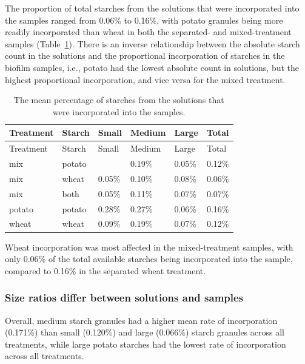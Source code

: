 \documentclass[
  b5paper,
]{book}
\begin{document}
The proportion of total starches from the solutions that were
incorporated into the samples ranged from 0.06\% to 0.16\%, with potato
granules being more readily incorporated than wheat in both the
separated- and mixed-treatment samples (Table~\ref{tbl-sample-prop}).
There is an inverse relationship between the absolute starch count in
the solutions and the proportional incorporation of starches in the
biofilm samples, i.e., potato had the lowest absolute count in
solutions, but the highest proportional incorporation, and vice versa
for the mixed treatment.

\hypertarget{tbl-sample-prop}{}
\begin{longtable}[]{@{}llllll@{}}
\caption{\label{tbl-sample-prop}The mean percentage of starches from the
solutions that were incorporated into the samples.}\tabularnewline
\toprule\noalign{}
Treatment & Starch & Small & Medium & Large & Total \\
\midrule\noalign{}
\endfirsthead
\toprule\noalign{}
Treatment & Starch & Small & Medium & Large & Total \\
\midrule\noalign{}
\endhead
\bottomrule\noalign{}
\endlastfoot
mix & potato & & 0.19\% & 0.05\% & 0.12\% \\
mix & wheat & 0.05\% & 0.10\% & 0.08\% & 0.06\% \\
mix & both & 0.05\% & 0.11\% & 0.07\% & 0.07\% \\
potato & potato & 0.28\% & 0.27\% & 0.06\% & 0.16\% \\
wheat & wheat & 0.09\% & 0.19\% & 0.07\% & 0.12\% \\
\end{longtable}

Wheat incorporation was most affected in the mixed-treatment samples,
with only 0.06\% of the total available starches being incorporated into
the sample, compared to 0.16\% in the separated wheat treatment.

\hypertarget{size-ratios-differ-between-solutions-and-samples}{%
\subsubsection{Size ratios differ between solutions and
samples}\label{size-ratios-differ-between-solutions-and-samples}}

Overall, medium starch granules had a higher mean rate of incorporation
(0.171\%) than small (0.120\%) and large (0.066\%) starch granules
across all treatments, while large potato starches had the lowest rate
of incorporation across all treatments.
\end{document}
